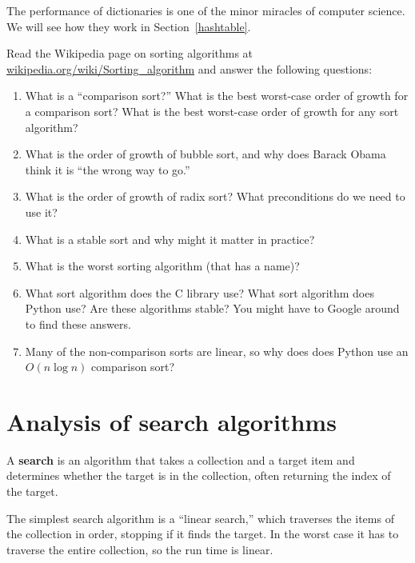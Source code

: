 \documentclass[10pt]{book}
\begin{document}
The performance of dictionaries is one of the minor miracles of
computer science.  We will see how they work in
Section~\ref{hashtable}.



\begin{ex}

Read the Wikipedia page on sorting algorithms at
\url{wikipedia.org/wiki/Sorting_algorithm} and answer
the following questions:

\begin{enumerate}

\item What is a ``comparison sort?'' What is the best worst-case order
  of growth for a comparison sort?  What is the best worst-case order
  of growth for any sort algorithm?

\item What is the order of growth of bubble sort, and why does Barack
  Obama think it is ``the wrong way to go.''

\item What is the order of growth of radix sort?  What preconditions
  do we need to use it?

\item What is a stable sort and why might it matter in practice?

\item What is the worst sorting algorithm (that has a name)?

\item What sort algorithm does the C library use?  What sort algorithm
  does Python use?  Are these algorithms stable?  You might have to
  Google around to find these answers.

\item Many of the non-comparison sorts are linear, so why does does
  Python use an $O(n \log n)$ comparison sort?

\end{enumerate}

\end{ex}


\section{Analysis of search algorithms}

A {\bf search} is an algorithm that takes a collection and a target
item and determines whether the target is in the collection, often
returning the index of the target.

The simplest search algorithm is a ``linear search,'' which traverses
the items of the collection in order, stopping if it finds the target.
In the worst case it has to traverse the entire collection, so the run
time is linear.
\end{document}
